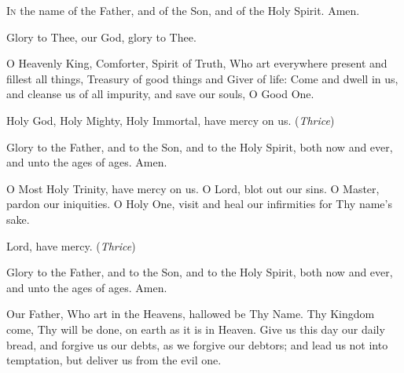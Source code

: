 \documentclass[%
letter]{memoir}
\newcommand\myred[0]{VioletRed4}
\newcommand\thrice[0]{\textcolor{\myred}{(\emph{Thrice})}}
\newcommand\glorybothnow[0]{Glory to the Father, and to the Son, and to the Holy Spirit, both now and ever, and unto the ages of ages. Amen.}
\begin{document}
\begin{tcolorbox}[Baystyle,colback=white]
  {
    \vspace*{5mm}
    \begin{center}
    \end{center}

    \renewcommand{\baselinestretch}{1.04}
    \setlength{\parindent}{1em}


    \begin{framed}
      {\fontsize{14}{14}\selectfont

        \begin{multicols}{2}[]

        \lettrine{I}{n} the name of the Father, and of the Son, and of the Holy Spirit. Amen.

        \vspace{5mm}

        Glory to Thee, our God, glory to Thee.

        O Heavenly King, Comforter, Spirit of Truth, Who art everywhere present and fillest all things, Treasury of good things and Giver of life: Come and dwell in us, and cleanse us of all impurity, and save our souls, O Good One.

        Holy God, Holy Mighty, Holy Immortal, have mercy on us. \thrice

        \glorybothnow

        O Most Holy Trinity, have mercy on us. O Lord, blot out our sins. O Master, pardon our iniquities. O Holy One, visit and heal our infirmities for Thy name's sake.

        Lord, have mercy. \thrice

        \glorybothnow

        Our Father, Who art in the Heavens, hallowed be Thy Name. Thy Kingdom come, Thy will be done, on earth as it is in Heaven. Give us this day our daily bread, and forgive us our debts, as we forgive our debtors; and lead us not into temptation, but deliver us from the evil one.

        \medskip


\end{multicols}}
\end{framed}}
\end{tcolorbox}
\end{document}
